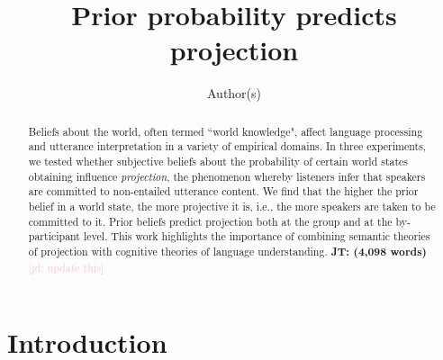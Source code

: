 \documentclass[11pt,fleqn]{article}
\title{Prior probability predicts projection}
\author{Author(s)}
\newcommand{\jd}[1]{\textcolor{Pink}{[jd: #1]}}
\newcommand{\jt}[1]{\textbf{\color{blue}JT: #1}}
\newcommand{\6}{\mbox{$[\hspace*{-.6mm}[$}}
\newcommand{\9}{\mbox{$]\hspace*{-.6mm}]$}}
\begin{document}

\maketitle

\begin{abstract}

Beliefs about the world, often termed ``world knowledge", affect language processing and utterance interpretation in a variety of empirical domains. In three experiments, we tested whether subjective beliefs about the probability of certain world states obtaining influence \emph{projection}, the phenomenon whereby listeners infer that speakers are  committed to non-entailed utterance content. We find that the higher the prior belief in a world state, the more projective it is, i.e., the more speakers are taken to be committed to it. Prior beliefs predict projection both at the group and at the by-participant level. This work highlights the importance of combining semantic theories of projection with cognitive theories of language understanding.  \jt{(4,098 words)}\jd{update this}

\end{abstract}


\section{Introduction}
\end{document}
